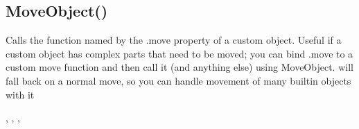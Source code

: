\documentclass[letterpaper,10pt,english]{sphinxmanual}
\begin{document}
\ignorespaces 

\subsection{MoveObject()}
\label{\detokenize{reference/utility:moveobject}}\label{\detokenize{reference/utility:index-31}}
\sphinxAtStartPar
{}

\sphinxAtStartPar
{}

\sphinxAtStartPar
Calls the function named by the  .move property of a custom object.  Useful if a custom object has complex parts that need to be moved; you can bind .move to a custom move function and then call it (and anything else) using MoveObject.  will fall back on a normal move, so you can handle movement of many built\sphinxhyphen{}in objects with it

\sphinxAtStartPar
{}

\begin{sphinxVerbatim}[commandchars=\\\{\}]
\end{sphinxVerbatim}

\sphinxAtStartPar
{}

\begin{sphinxVerbatim}[commandchars=\\\{\}]
\end{sphinxVerbatim}

\sphinxAtStartPar
{}

\sphinxAtStartPar
{}, , , 
\end{document}
